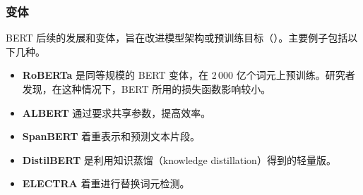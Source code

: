 \subsubsection{变体}
BERT 后续的发展和变体，旨在改进模型架构或预训练目标（）。主要例子包括以下几种。
\begin{itemize}
\item \textbf{RoBERTa} 是同等规模的 BERT 变体，在 2\,000 亿个词元上预训练。研究者发现，在这种情况下，BERT 所用的损失函数影响较小。
\item \textbf{ALBERT} 通过要求共享参数，提高效率。
\item \textbf{SpanBERT} 着重表示和预测文本片段。
\item \textbf{DistilBERT} 是利用知识蒸馏（knowledge distillation）得到的轻量版。
\item \textbf{ELECTRA} 着重进行替换词元检测。
\end{itemize}
